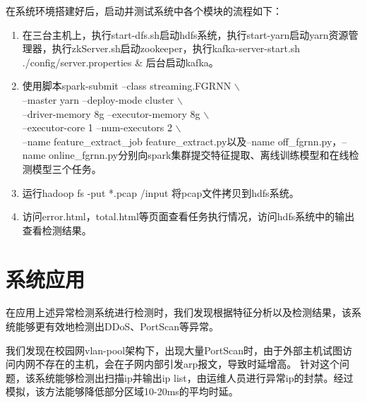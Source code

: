 在系统环境搭建好后，启动并测试系统中各个模块的流程如下：
\begin{enumerate}
  \item 在三台主机上，执行start-dfs.sh启动hdfs系统，执行start-yarn启动yarn资源管理器，执行zkServer.sh启动zookeeper，执行kafka-server-start.sh ./config/server.properties \& 后台启动kafka。
  \item 使用脚本spark-submit --class streaming.FGRNN $\backslash$ \\
  --master yarn --deploy-mode cluster $\backslash$ \\
  --driver-memory 8g --executor-memory 8g $\backslash$ \\
  --executor-core 1 --num-executors 2 $\backslash$ \\
 --name feature\_extract\_job feature\_extract.py以及--name off\_fgrnn.py，--name online\_fgrnn.py分别向spark集群提交特征提取、离线训练模型和在线检测模型三个任务。
 \item 运行hadoop fs -put *.pcap /input 将pcap文件拷贝到hdfs系统。
 \item 访问error.html，total.html等页面查看任务执行情况，访问hdfs系统中的输出查看检测结果。
\end{enumerate}

\section{系统应用}
在应用上述异常检测系统进行检测时，我们发现根据特征分析以及检测结果，该系统能够更有效地检测出DDoS、PortScan等异常。

我们发现在校园网vlan-pool架构下，出现大量PortScan时，由于外部主机试图访问内网不存在的主机，会在子网内部引发arp报文，导致时延增高。
针对这个问题，该系统能够检测出扫描ip并输出ip list，由运维人员进行异常ip的封禁。经过模拟，该方法能够降低部分区域10-20ms的平均时延。
